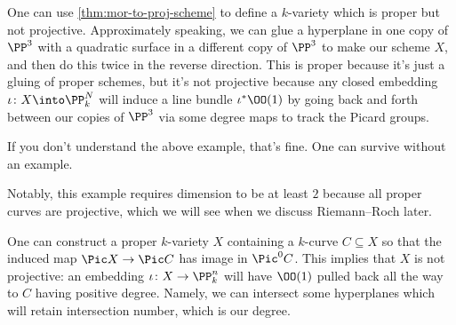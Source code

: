 \documentclass[../notes.tex]{subfiles}
\begin{document}
\begin{ex} %
	One can use \autoref{thm:mor-to-proj-scheme} to define a $k$-variety which is proper but not projective. Approximately speaking, we can glue a hyperplane in one copy of $\PP^3$ with a quadratic surface in a different copy of $\PP^3$ to make our scheme $X$, and then do this twice in the reverse direction. This is proper because it's just a gluing of proper schemes, but it's not projective because any closed embedding $\iota\colon X\into\PP^N_k$ will induce a line bundle $\iota^*\OO(1)$ by going back and forth between our copies of $\PP^3$ via some degree maps to track the Picard groups.
\end{ex}
\begin{remark}
	If you don't understand the above example, that's fine. One can survive without an example.
\end{remark}
\begin{remark}
	Notably, this example requires dimension to be at least $2$ because all proper curves are projective, which we will see when we discuss Riemann--Roch later.
\end{remark}
\begin{example} %
	One can construct a proper $k$-variety $X$ containing a $k$-curve $C\subseteq X$ so that the induced map $\Pic X\to\Pic C$ has image in $\Pic^0C$. This implies that $X$ is not projective: an embedding $\iota\colon X\to\PP^n_k$ will have $\OO(1)$ pulled back all the way to $C$ having positive degree. Namely, we can intersect some hyperplanes which will retain intersection number, which is our degree.
\end{example}
\end{document}
